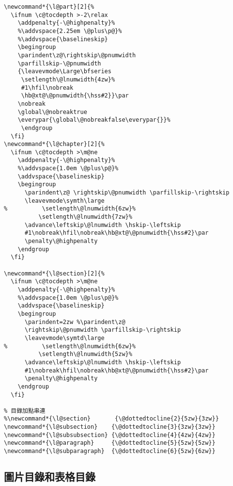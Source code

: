 \begin{lstlisting}[firstnumber=1296]
\newcommand*{\l@part}[2]{%
  \ifnum \c@tocdepth >-2\relax
    \addpenalty{-\@highpenalty}%
    %\addvspace{2.25em \@plus\p@}%
    %\addvspace{\baselineskip}
    \begingroup
    \parindent\z@\rightskip\@pnumwidth
    \parfillskip-\@pnumwidth
    {\leavevmode\Large\bfseries
     \setlength\@lnumwidth{4zw}%
     #1\hfil\nobreak
     \hb@xt@\@pnumwidth{\hss#2}}\par
    \nobreak
    \global\@nobreaktrue
    \everypar{\global\@nobreakfalse\everypar{}}%
     \endgroup
  \fi}
\newcommand*{\l@chapter}[2]{%
  \ifnum \c@tocdepth >\m@ne
    \addpenalty{-\@highpenalty}%
    %\addvspace{1.0em \@plus\p@}%
    \addvspace{\baselineskip}
    \begingroup
      \parindent\z@ \rightskip\@pnumwidth \parfillskip-\rightskip
      \leavevmode\symth\large
%          \setlength\@lnumwidth{6zw}%
          \setlength\@lnumwidth{7zw}%
      \advance\leftskip\@lnumwidth \hskip-\leftskip
      #1\nobreak\hfil\nobreak\hb@xt@\@pnumwidth{\hss#2}\par
      \penalty\@highpenalty
    \endgroup
  \fi}

\newcommand*{\l@section}[2]{%
  \ifnum \c@tocdepth >\m@ne
    \addpenalty{-\@highpenalty}%
    %\addvspace{1.0em \@plus\p@}%
    \addvspace{\baselineskip}
    \begingroup
      \parindent=2zw %\parindent\z@
      \rightskip\@pnumwidth \parfillskip-\rightskip
      \leavevmode\symtd\large
%          \setlength\@lnumwidth{6zw}%
          \setlength\@lnumwidth{5zw}%
      \advance\leftskip\@lnumwidth \hskip-\leftskip
      #1\nobreak\hfil\nobreak\hb@xt@\@pnumwidth{\hss#2}\par
      \penalty\@highpenalty
    \endgroup
  \fi}

% 目錄加點串連
%\newcommand*{\l@section}       {\@dottedtocline{2}{5zw}{3zw}}
\newcommand*{\l@subsection}    {\@dottedtocline{3}{3zw}{3zw}}
\newcommand*{\l@subsubsection} {\@dottedtocline{4}{4zw}{4zw}}
\newcommand*{\l@paragraph}     {\@dottedtocline{5}{5zw}{5zw}}
\newcommand*{\l@subparagraph}  {\@dottedtocline{6}{5zw}{6zw}}
\end{lstlisting}


\subsection{圖片目錄和表格目錄}

